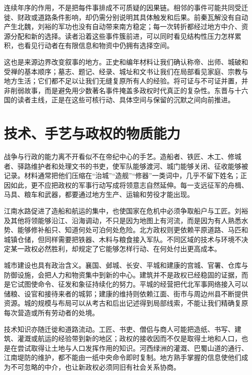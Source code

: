 连续年序的作用，不是把每件事排成不可质疑的因果链。相邻的事件可能共同受迁徙、财政或道路条件影响，却仍需分别说明其具体触发和后果。前秦瓦解没有自动产生北魏，刘裕的军功也没有自动带来南方稳定；每一次转折都经过地方中介、资源分配和新的选择。读者沿着这些事件簇前进，可以同时看见结构性压力怎样累积，也看见行动者在有限信息和物资中仍拥有选择空间。

这也是来源边界改变叙事的地方。正史和编年材料让我们确认称帝、出师、城破和受禅的基本顺序；墓志、题记、经录、城址和文书让我们在局部看见家庭、宗教与地方生活；它们都不足以让我们无缝复原所有人的经验。将可证与不可证并置，并非削弱故事，而是避免用少数著名事件掩盖多政权时代真正的复杂性。东晋与十六国的读者主线，正是在这些可核行动、具体空间与保留的沉默之间向前推进。

\section{技术、手艺与政权的物质能力}
\label{sec:eastern-jin-depth-material-capacity}

战争与行政的能力离不开看似不在帝纪中心的手艺。造船者、铁匠、木工、修城者、驿路维护者和处理文书的书吏，使军队能够渡河、城门能够关闭、征收能够被记录。材料通常把他们压缩在“治城”“造舰”“修器”一类词中，几乎不留下姓名；正因如此，更不应把政权的军事行动写成将领意志自然延伸。每一支远征军的舟楫、马具、粮车和武器，都要通过地方生产、运输和劳役才能出现。

江南水路促进了造船和航运的集中，也使国家在危机中必须争取船户与工匠。刘裕及其他将领能够沿江、沿海调动，不只是因为地图上有河流，而是因为有人熟悉水势、能够修补船只、知道何处可泊何处危险。北方政权则更依赖平原道路、马匹和城镇仓储，但同样需要把铁器、木料与粮食接入军队。不同区域的技术与环境不决定某一政权必然胜利，却规定了它能够怎样行动、在何处付出更高成本。

城市建设也具有政治含义。襄国、邺城、长安、平城和建康的宫城、官署、仓库与防御设施，会把人力和物资集中到新的中心。建筑并不是政权已经稳固的证据，而是它试图使命令、征发和象征持续化的努力。平城的经营把代北军事网络接入可以储粮、设官和接待来者的城郭；建康的维持则依赖江面、街市与周边州县不断提供资源。城的规模与布局可以从考古和后出记述得到局部线索，不能让我们精确复原每次营造或所有劳动者的处境。

技术知识亦随迁徙和道路流动。工匠、书吏、僧侣与商人可能把造纸、书写、建筑、灌溉或航运的经验带到新的地区；政权的接收因而不仅是取得土地和人口，也是在尝试取得让土地与人口发挥作用的知识。河西绿洲的灌溉、巴蜀山道的通行、江南堤防的维护，都不能由一纸中央命令即时复制。地方熟手掌握的信息使他们成为不可忽略的中介，也让新政权必须同旧有社会关系协商。

